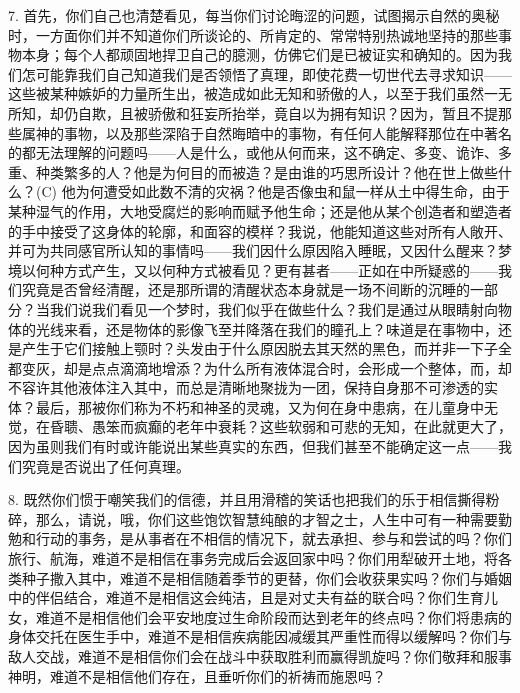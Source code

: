 7. 首先，你们自己也清楚看见，每当你们讨论晦涩的问题，试图揭示自然的奥秘时，一方面你们并不知道你们所谈论的、所肯定的、常常特别热诚地坚持的那些事物本身；每个人都顽固地捍卫自己的臆测，仿佛它们是已被证实和确知的。因为我们怎可能靠我们自己知道我们是否领悟了真理，即使花费一切世代去寻求知识——这些被某种嫉妒的力量所生出，被造成如此无知和骄傲的人，以至于我们虽然一无所知，却仍自欺，且被骄傲和狂妄所抬举，竟自以为拥有知识？因为，暂且不提那些属神的事物，以及那些深陷于自然晦暗中的事物，有任何人能解释那位在中著名的都无法理解的问题吗——人是什么，或他从何而来，这不确定、多变、诡诈、多重、种类繁多的人？他是为何目的而被造？是由谁的巧思所设计？他在世上做些什么？(C) 他为何遭受如此数不清的灾祸？他是否像虫和鼠一样从土中得生命，由于某种湿气的作用，大地受腐烂的影响而赋予他生命；还是他从某个创造者和塑造者的手中接受了这身体的轮廓，和面容的模样？我说，他能知道这些对所有人敞开、并可为共同感官所认知的事情吗——我们因什么原因陷入睡眠，又因什么醒来？梦境以何种方式产生，又以何种方式被看见？更有甚者——正如在中所疑惑的——我们究竟是否曾经清醒，还是那所谓的清醒状态本身就是一场不间断的沉睡的一部分？当我们说我们看见一个梦时，我们似乎在做些什么？我们是通过从眼睛射向物体的光线来看，还是物体的影像飞至并降落在我们的瞳孔上？味道是在事物中，还是产生于它们接触上颚时？头发由于什么原因脱去其天然的黑色，而并非一下子全都变灰，却是点点滴滴地增添？为什么所有液体混合时，会形成一个整体，而，却不容许其他液体注入其中，而总是清晰地聚拢为一团，保持自身那不可渗透的实体？最后，那被你们称为不朽和神圣的灵魂，又为何在身中患病，在儿童身中无觉，在昏聩、愚笨而疯癫的老年中衰耗？这些软弱和可悲的无知，在此就更大了，因为虽则我们有时或许能说出某些真实的东西，但我们甚至不能确定这一点——我们究竟是否说出了任何真理。\par

8. 既然你们惯于嘲笑我们的信德，并且用滑稽的笑话也把我们的乐于相信撕得粉碎，那么，请说，哦，你们这些饱饮智慧纯酿的才智之士，人生中可有一种需要勤勉和行动的事务，是从事者在不相信的情况下，就去承担、参与和尝试的吗？你们旅行、航海，难道不是相信在事务完成后会返回家中吗？你们用犁破开土地，将各类种子撒入其中，难道不是相信随着季节的更替，你们会收获果实吗？你们与婚姻中的伴侣结合，难道不是相信这会纯洁，且是对丈夫有益的联合吗？你们生育儿女，难道不是相信他们会平安地度过生命阶段而达到老年的终点吗？你们将患病的身体交托在医生手中，难道不是相信疾病能因减缓其严重性而得以缓解吗？你们与敌人交战，难道不是相信你们会在战斗中获取胜利而赢得凯旋吗？你们敬拜和服事神明，难道不是相信他们存在，且垂听你们的祈祷而施恩吗？\par

